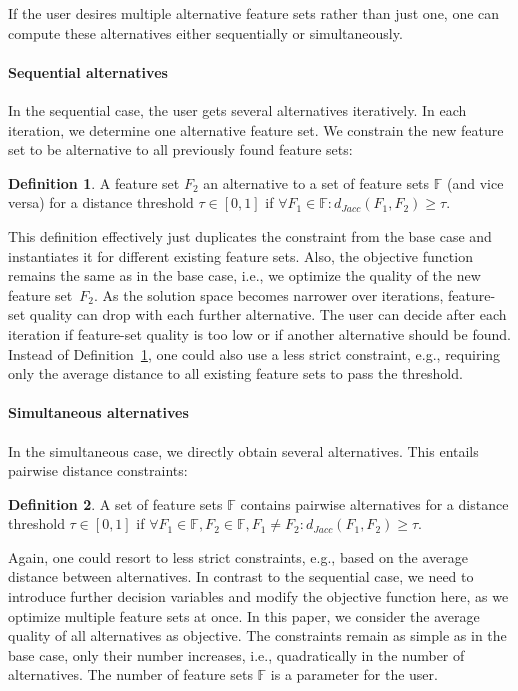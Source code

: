 \documentclass{article}
\theoremstyle{definition}
\newtheorem{definition}{Definition}
\begin{document}
If the user desires multiple alternative feature sets rather than just one, one can compute these alternatives either sequentially or simultaneously.

\paragraph{Sequential alternatives}

In the sequential case, the user gets several alternatives iteratively.
In each iteration, we determine one alternative feature set.
We constrain the new feature set to be alternative to all previously found feature sets:
%
\begin{definition}
	A feature set $F_2$ an alternative to a set of feature sets $\mathbb{F}$ (and vice versa) for a distance threshold $\tau \in [0,1]$ if $\forall F_1 \in \mathbb{F}: d_{Jacc}(F_1,F_2) \geq \tau$.
	\label{def:sequential-alternative}
\end{definition}
%
This definition effectively just duplicates the constraint from the base case and instantiates it for different existing feature sets.
Also, the objective function remains the same as in the base case, i.e., we optimize the quality of the new feature set~$F_2$.
As the solution space becomes narrower over iterations, feature-set quality can drop with each further alternative.
The user can decide after each iteration if feature-set quality is too low or if another alternative should be found.
Instead of Definition~\ref{def:sequential-alternative}, one could also use a less strict constraint, e.g., requiring only the average distance to all existing feature sets to pass the threshold.

\paragraph{Simultaneous alternatives}

In the simultaneous case, we directly obtain several alternatives.
This entails pairwise distance constraints:
%
\begin{definition}
	A set of feature sets $\mathbb{F}$ contains pairwise alternatives for a distance threshold $\tau \in [0,1]$ if $\forall F_1 \in \mathbb{F}, F_2 \in \mathbb{F}, F_1 \neq F_2: d_{Jacc}(F_1,F_2) \geq \tau$.
	\label{def:simultaneous-alternative}
\end{definition}
%
Again, one could resort to less strict constraints, e.g., based on the average distance between alternatives.
In contrast to the sequential case, we need to introduce further decision variables and modify the objective function here, as we optimize multiple feature sets at once.
In this paper, we consider the average quality of all alternatives as objective.
The constraints remain as simple as in the base case, only their number increases, i.e., quadratically in the number of alternatives.
The number of feature sets $\mathbb{F}$ is a parameter for the user.
\end{document}
